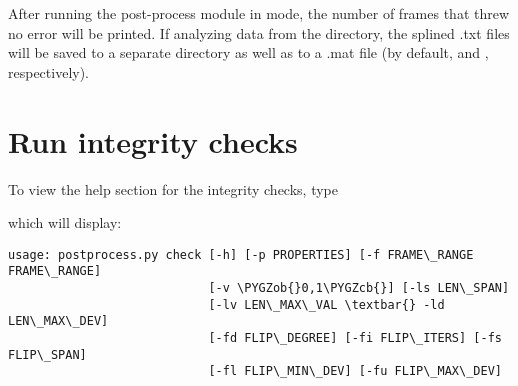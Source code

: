 \documentclass[letterpaper,10pt,openany,oneside]{sphinxmanual}
\def\PYGZob{\char`\{}
\def\PYGZcb{\char`\}}
\begin{document}
After running the post-process module in  mode, the number of frames that threw no error will be printed. If analyzing data from the  directory, the splined .txt files will be saved to a separate directory as well as to a .mat file (by default,  and , respectively).


\chapter{Run integrity checks}
\label{index:run-integrity-checks}
To view the help section for the integrity checks, type


which will display:

\begin{Verbatim}[commandchars=\\\{\}]
usage: postprocess.py check [-h] [-p PROPERTIES] [-f FRAME\_RANGE FRAME\_RANGE]
                            [-v \PYGZob{}0,1\PYGZcb{}] [-ls LEN\_SPAN]
                            [-lv LEN\_MAX\_VAL \textbar{} -ld LEN\_MAX\_DEV]
                            [-fd FLIP\_DEGREE] [-fi FLIP\_ITERS] [-fs FLIP\_SPAN]
                            [-fl FLIP\_MIN\_DEV] [-fu FLIP\_MAX\_DEV]


\end{Verbatim}
\end{document}
